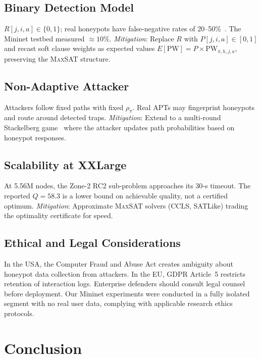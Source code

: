 \documentclass[journal]{IEEEtran}
\newcommand{\MAXSAT}{\textsc{MaxSAT}}
\begin{document}
\subsection{Binary Detection Model}
\label{sec:limitations:binary}
$R[j,i,a]\in\{0,1\}$; real honeypots have false-negative rates of
20--50\%~\cite{huang2019}. The Mininet testbed measured ${\approx}10\%$.
\textit{Mitigation}: Replace $R$ with $P[j,i,a]\in[0,1]$ and recast
soft clause weights as expected values $E[\mathrm{PW}]=P\times
\mathrm{PW}_{\pi,h,j,a}$, preserving the \MAXSAT{} structure.

\subsection{Non-Adaptive Attacker}
Attackers follow fixed paths with fixed $\rho_\pi$. Real APTs may
fingerprint honeypots and route around detected traps.
\textit{Mitigation}: Extend to a multi-round Stackelberg
game~\cite{kiekintveld2015} where the attacker updates path
probabilities based on honeypot responses.

\subsection{Scalability at XXLarge}
\label{sec:limitations:scale}
At 5.56M nodes, the Zone-2 RC2 sub-problem approaches its 30-s
timeout. The reported $Q=58.3$ is a lower bound on achievable quality,
not a certified optimum. \textit{Mitigation}: Approximate \MAXSAT{}
solvers (CCLS, SATLike) trading the optimality certificate for speed.

\subsection{Ethical and Legal Considerations}
In the USA, the Computer Fraud and Abuse Act creates ambiguity about
honeypot data collection from attackers. In the EU, GDPR Article~5
restricts retention of interaction logs. Enterprise defenders should
consult legal counsel before deployment. Our Mininet experiments were
conducted in a fully isolated segment with no real user data,
complying with applicable research ethics protocols.

\section{Conclusion}
\label{sec:conclusion}
\end{document}
